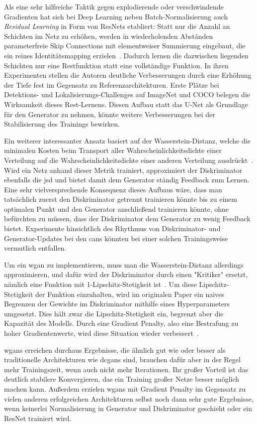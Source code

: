 Als eine sehr hilfreiche Taktik gegen explodierende oder verschwindende Gradienten hat sich bei Deep Learning neben Batch-Normalisierung auch \emph{Residual Learning} in Form von ResNets etabliert:
Statt nur die Anzahl an Schichten im Netz zu erhöhen, werden in wiederholenden Abständen parameterfreie Skip Connections mit elementweiser Summierung eingebaut, die ein reines Identitätsmapping erzielen~\cite{He.2016}.
Dadurch lernen die dazwischen liegenden Schichten nur eine Restfunktion statt eine vollständige Funktion.
In ihren Experimenten stellen die Autoren deutliche Verbesserungen durch eine Erhöhung der Tiefe fest im Gegensatz zu Referenzarchitekturen.
Erste Plätze bei Detektions- und Lokalisierungs-Challenges auf ImageNet und COCO belegen die Wirksamkeit dieses Rest-Lernens.
Diesen Aufbau statt das U-Net als Grundlage für den Generator zu nehmen, könnte weitere Verbesserungen bei der Stabilisierung des Trainings bewirken.

Ein weiterer interessanter Ansatz basiert auf der Wasserstein-Distanz, welche die minimalen Kosten beim Transport aller Wahrscheinlichkeitsdichte einer Verteilung auf die Wahrscheinlichkeitsdichte einer anderen Verteilung ausdrückt~\cite{Arjovsky.2017}.
Wird ein Netz anhand dieser Metrik trainiert, approximiert der Diskriminator ebenfalls die \gls{jsd} und bietet damit dem Generator ständig Feedback zum Lernen.
Eine sehr vielversprechende Konsequenz dieses Aufbaus wäre, dass man tatsächlich zuerst den Diskriminator getrennt trainieren könnte bis zu einem optimalen Punkt und den Generator anschließend trainieren könnte, ohne befürchten zu müssen, dass der Diskriminator dem Generator zu wenig Feedback bietet.
Experimente hinsichtlich des Rhythmus von Diskriminator- und Generator-Updates bei den \glspl{can} könnten bei einer solchen Trainingsweise vermutlich entfallen.

Um ein \gls{wgan} zu implementieren, muss man die Wasserstein-Distanz allerdings approximieren, und dafür wird der Diskriminator durch einen "Kritiker" ersetzt, nämlich eine Funktion mit 1-Lipschitz-Stetigkeit ist~\cite{Arjovsky.2017b}.
Um diese Lipschitz-Stetigkeit der Funktion einzuhalten, wird im originalen Paper ein naives Begrenzen der Gewichte im Diskriminator mithilfe eines Hyperparameters umgesetzt.
Dies hält zwar die Lipschitz-Stetigkeit ein, begrenzt aber die Kapazität des Modells.
Durch eine Gradient Penalty, also eine Bestrafung zu hoher Gradientenwerte, wird diese Situation wieder verbessert~\cite{Gulrajani.2017}.

\glspl{wgan} erreichen durchaus Ergebnisse, die ähnlich gut wie oder besser als traditionelle Architekturen wie \glspl{dcgan} sind, brauchen dafür aber in der Regel mehr Trainingszeit, wenn auch nicht mehr Iterationen.
Ihr großer Vorteil ist das deutlich stabilere Konvergieren, das ein Training großer Netze besser möglich machen kann.
Außerdem erzielen \glspl{wgan} mit Gradient Penalty im Gegensatz zu vielen anderen erfolgreichen Architekturen selbst noch dann sehr gute Ergebnisse, wenn keinerlei Normalisierung in Generator und Diskriminator geschieht oder ein ResNet trainiert wird.


